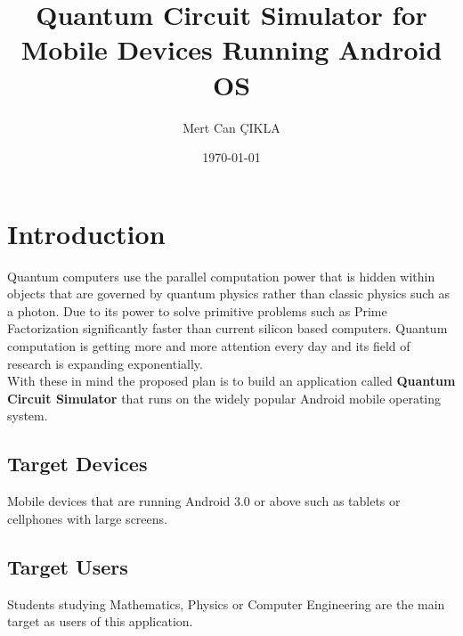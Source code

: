 \documentclass[12pt]{article}
\begin{document}

\title{Quantum Circuit Simulator for \\
Mobile Devices Running Android OS}
\author{Mert Can ÇIKLA}
\date{\today}

 
 



\maketitle


\section{Introduction}

	Quantum computers use the parallel computation power that is hidden
within objects that are governed by quantum physics rather than classic physics such as a photon.
Due to its power to solve primitive problems such as Prime Factorization significantly faster 
than current silicon based computers. Quantum computation is getting more and more attention 
every day and its field of research is expanding exponentially.\\
 
 With these in mind the proposed
plan is to build an application called \textbf{Quantum Circuit Simulator}
that runs on the widely popular Android mobile operating system. 

\subsection{Target Devices}
Mobile devices that are running Android 3.0 or above such as tablets or cellphones with large screens.
\subsection{Target Users}
Students studying Mathematics, Physics or Computer Engineering are the main 
target as users of this application.
\end{document}
